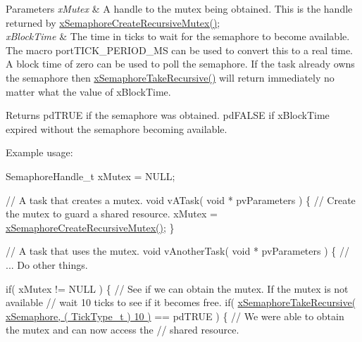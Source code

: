 \begin{DoxyParams}{Parameters}
{\em x\+Mutex} & A handle to the mutex being obtained. This is the handle returned by \hyperlink{vendor_2ceedling_2plugins_2freertos_2src_2freertos_2include_2semphr_8h_a1bbc843be5a41ea83d2693b2189fc0f8}{x\+Semaphore\+Create\+Recursive\+Mutex()};\\
\hline
{\em x\+Block\+Time} & The time in ticks to wait for the semaphore to become available. The macro port\+T\+I\+C\+K\+\_\+\+P\+E\+R\+I\+O\+D\+\_\+\+MS can be used to convert this to a real time. A block time of zero can be used to poll the semaphore. If the task already owns the semaphore then \hyperlink{vendor_2ceedling_2plugins_2freertos_2src_2freertos_2include_2semphr_8h_ad395f4bba51eea6af3397d72bc079e4d}{x\+Semaphore\+Take\+Recursive()} will return immediately no matter what the value of x\+Block\+Time.\\
\hline
\end{DoxyParams}
\begin{DoxyReturn}{Returns}
pd\+T\+R\+UE if the semaphore was obtained. pd\+F\+A\+L\+SE if x\+Block\+Time expired without the semaphore becoming available.
\end{DoxyReturn}
Example usage\+: 
\begin{DoxyPre}
SemaphoreHandle\_t xMutex = NULL;\end{DoxyPre}



\begin{DoxyPre}// A task that creates a mutex.
void vATask( void * pvParameters )
\{
 // Create the mutex to guard a shared resource.
 xMutex = \hyperlink{vendor_2ceedling_2plugins_2freertos_2src_2freertos_2include_2semphr_8h_a1bbc843be5a41ea83d2693b2189fc0f8}{xSemaphoreCreateRecursiveMutex()};
\}\end{DoxyPre}



\begin{DoxyPre}// A task that uses the mutex.
void vAnotherTask( void * pvParameters )
\{
 // ... Do other things.\end{DoxyPre}



\begin{DoxyPre} if( xMutex != NULL )
 \{
     // See if we can obtain the mutex.  If the mutex is not available
     // wait 10 ticks to see if it becomes free.
     if( \hyperlink{vendor_2ceedling_2plugins_2freertos_2src_2freertos_2include_2semphr_8h_ad395f4bba51eea6af3397d72bc079e4d}{xSemaphoreTakeRecursive( xSemaphore, ( TickType\_t ) 10 )} == pdTRUE )
     \{
         // We were able to obtain the mutex and can now access the
         // shared resource.\end{DoxyPre}



